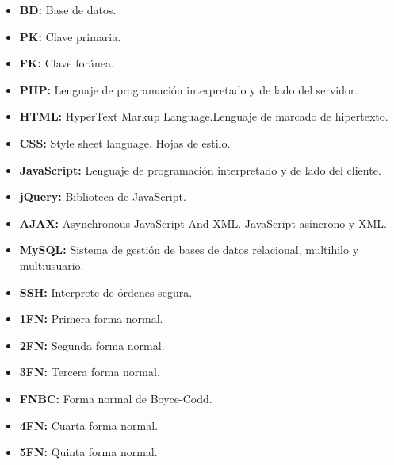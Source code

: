 

\thispagestyle{empty}

\begin{itemize}
  \item {} \textbf{BD:} Base de datos.
  \item {} \textbf{PK:} Clave primaria.
  \item {} \textbf{FK:} Clave foránea.
  \item {}\textbf{PHP:} Lenguaje de programación interpretado y de lado del servidor.
  \item {} \textbf{HTML:} HyperText Markup Language.Lenguaje de marcado de hipertexto.
  \item {}\textbf{CSS:} Style sheet language. Hojas de estilo.
  \item {}\textbf{JavaScript:} Lenguaje de programación interpretado y de lado del cliente.
  \item {}\textbf{jQuery:} Biblioteca de JavaScript.
  \item {}\textbf{AJAX:} Asynchronous JavaScript And XML. JavaScript asíncrono y XML.
  \item {}\textbf{MySQL:} Sistema de gestión de bases de datos relacional, multihilo y multiusuario.
  \item {}\textbf{SSH:} Interprete de órdenes segura.
  \item \textbf{1FN:} Primera forma normal.
  \item \textbf{2FN:} Segunda forma normal.
  \item \textbf{3FN:} Tercera forma normal.
  \item \textbf{FNBC:} Forma normal de Boyce-Codd.
  \item \textbf{4FN:} Cuarta forma normal.
  \item \textbf{5FN:} Quinta forma normal.
\end{itemize}
